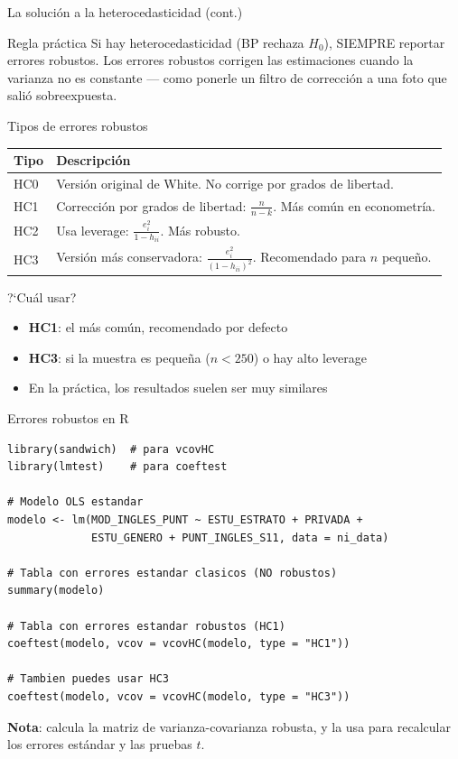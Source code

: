 \documentclass[aspectratio=169, 11pt]{beamer}
\begin{document}
\begin{frame}{La soluci\'on a la heterocedasticidad (cont.)}
\begin{alertblock}{Regla pr\'actica}
Si hay heterocedasticidad (BP rechaza $H_0$), SIEMPRE reportar errores robustos. Los errores robustos corrigen las estimaciones cuando la varianza no es constante --- como ponerle un filtro de correcci\'on a una foto que sali\'o sobreexpuesta.
\end{alertblock}
\end{frame}

\begin{frame}{Tipos de errores robustos}
\begin{center}
\renewcommand{\arraystretch}{1.2}
\small
\begin{tabular}{lp{7cm}}
\toprule
\textbf{Tipo} & \textbf{Descripci\'on} \\
\midrule
HC0 & Versi\'on original de White. No corrige por grados de libertad. \\
HC1 & Correcci\'on por grados de libertad: $\frac{n}{n-k}$. M\'as com\'un en econometr\'ia. \\
HC2 & Usa leverage: $\frac{e_i^2}{1 - h_{ii}}$. M\'as robusto. \\
HC3 & Versi\'on m\'as conservadora: $\frac{e_i^2}{(1 - h_{ii})^2}$. Recomendado para $n$ peque\~no. \\
\bottomrule
\end{tabular}
\end{center}

\begin{block}{?`Cu\'al usar?}
\begin{itemize}
\item \textbf{HC1}: el más común, recomendado por defecto
\item \textbf{HC3}: si la muestra es pequeña ($n < 250$) o hay alto leverage
\item En la práctica, los resultados suelen ser muy similares
\end{itemize}
\end{block}
\end{frame}

\begin{frame}[fragile]{Errores robustos en R}
\begin{lstlisting}
library(sandwich)  # para vcovHC
library(lmtest)    # para coeftest

# Modelo OLS estandar
modelo <- lm(MOD_INGLES_PUNT ~ ESTU_ESTRATO + PRIVADA +
             ESTU_GENERO + PUNT_INGLES_S11, data = ni_data)

# Tabla con errores estandar clasicos (NO robustos)
summary(modelo)

# Tabla con errores estandar robustos (HC1)
coeftest(modelo, vcov = vcovHC(modelo, type = "HC1"))

# Tambien puedes usar HC3
coeftest(modelo, vcov = vcovHC(modelo, type = "HC3"))
\end{lstlisting}

\vspace{0.15cm}
\small
\textbf{Nota}:  calcula la matriz de varianza-covarianza robusta, y  la usa para recalcular los errores estándar y las pruebas $t$.
\end{frame}
\end{document}
